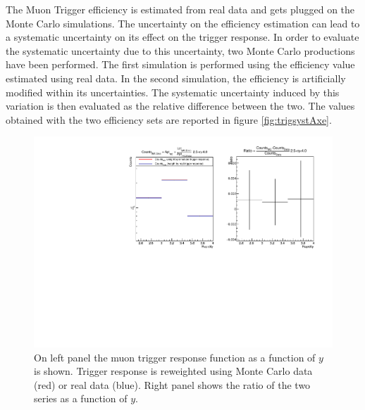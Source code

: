 The Muon Trigger efficiency is estimated from real data and gets plugged on the Monte Carlo simulations.
The uncertainty on the efficiency estimation can lead to a systematic uncertainty on its effect on the trigger response.
In order to evaluate the systematic uncertainty due to this uncertainty, two Monte Carlo productions have been performed.
The first simulation is performed using the efficiency value estimated using real data.
In the second simulation, the efficiency is artificially modified within its uncertainties.
The systematic uncertainty induced by this variation is then evaluated as the relative difference between the two.
The values obtained with the two efficiency sets are reported in figure \ref{fig:trigsystAxe}.

\begin{figure}[!htb]
\begin{center}
\includegraphics[width=0.9\linewidth]{Chapters/Analysis/Figs/ResponseFunctionSyst.pdf}
\caption{On left panel the muon trigger response function as a function of $y$ is shown. Trigger response is reweighted using Monte Carlo data (red) or real data (blue). Right panel shows the ratio of the two series as a function of $y$.}
\label{fig:trigsystRF}
\end{center}
\end{figure}

